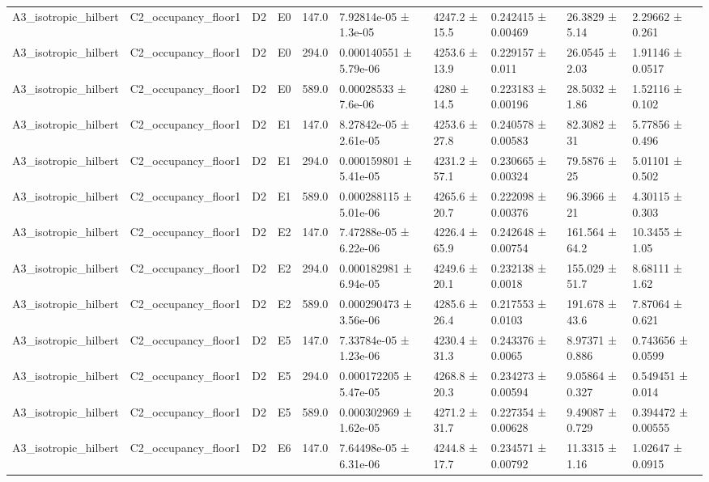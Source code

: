 \begin{table}
\begin{tabular}{llllllllll}
A3\_isotropic\_hilbert & C2\_occupancy\_floor1 & D2 & E0 & 147.0 & 7.92814e-05 ± 1.3e-05 & 4247.2 ± 15.5 & 0.242415 ± 0.00469 & 26.3829 ± 5.14 & 2.29662 ± 0.261 \\
A3\_isotropic\_hilbert & C2\_occupancy\_floor1 & D2 & E0 & 294.0 & 0.000140551 ± 5.79e-06 & 4253.6 ± 13.9 & 0.229157 ± 0.011 & 26.0545 ± 2.03 & 1.91146 ± 0.0517 \\
A3\_isotropic\_hilbert & C2\_occupancy\_floor1 & D2 & E0 & 589.0 & 0.00028533 ± 7.6e-06 & 4280 ± 14.5 & 0.223183 ± 0.00196 & 28.5032 ± 1.86 & 1.52116 ± 0.102 \\
A3\_isotropic\_hilbert & C2\_occupancy\_floor1 & D2 & E1 & 147.0 & 8.27842e-05 ± 2.61e-05 & 4253.6 ± 27.8 & 0.240578 ± 0.00583 & 82.3082 ± 31 & 5.77856 ± 0.496 \\
A3\_isotropic\_hilbert & C2\_occupancy\_floor1 & D2 & E1 & 294.0 & 0.000159801 ± 5.41e-05 & 4231.2 ± 57.1 & 0.230665 ± 0.00324 & 79.5876 ± 25 & 5.01101 ± 0.502 \\
A3\_isotropic\_hilbert & C2\_occupancy\_floor1 & D2 & E1 & 589.0 & 0.000288115 ± 5.01e-06 & 4265.6 ± 20.7 & 0.222098 ± 0.00376 & 96.3966 ± 21 & 4.30115 ± 0.303 \\
A3\_isotropic\_hilbert & C2\_occupancy\_floor1 & D2 & E2 & 147.0 & 7.47288e-05 ± 6.22e-06 & 4226.4 ± 65.9 & 0.242648 ± 0.00754 & 161.564 ± 64.2 & 10.3455 ± 1.05 \\
A3\_isotropic\_hilbert & C2\_occupancy\_floor1 & D2 & E2 & 294.0 & 0.000182981 ± 6.94e-05 & 4249.6 ± 20.1 & 0.232138 ± 0.0018 & 155.029 ± 51.7 & 8.68111 ± 1.62 \\
A3\_isotropic\_hilbert & C2\_occupancy\_floor1 & D2 & E2 & 589.0 & 0.000290473 ± 3.56e-06 & 4285.6 ± 26.4 & 0.217553 ± 0.0103 & 191.678 ± 43.6 & 7.87064 ± 0.621 \\
A3\_isotropic\_hilbert & C2\_occupancy\_floor1 & D2 & E5 & 147.0 & 7.33784e-05 ± 1.23e-06 & 4230.4 ± 31.3 & 0.243376 ± 0.0065 & 8.97371 ± 0.886 & 0.743656 ± 0.0599 \\
A3\_isotropic\_hilbert & C2\_occupancy\_floor1 & D2 & E5 & 294.0 & 0.000172205 ± 5.47e-05 & 4268.8 ± 20.3 & 0.234273 ± 0.00594 & 9.05864 ± 0.327 & 0.549451 ± 0.014 \\
A3\_isotropic\_hilbert & C2\_occupancy\_floor1 & D2 & E5 & 589.0 & 0.000302969 ± 1.62e-05 & 4271.2 ± 31.7 & 0.227354 ± 0.00628 & 9.49087 ± 0.729 & 0.394472 ± 0.00555 \\
A3\_isotropic\_hilbert & C2\_occupancy\_floor1 & D2 & E6 & 147.0 & 7.64498e-05 ± 6.31e-06 & 4244.8 ± 17.7 & 0.234571 ± 0.00792 & 11.3315 ± 1.16 & 1.02647 ± 0.0915 \\

\end{tabular}
\end{table}
